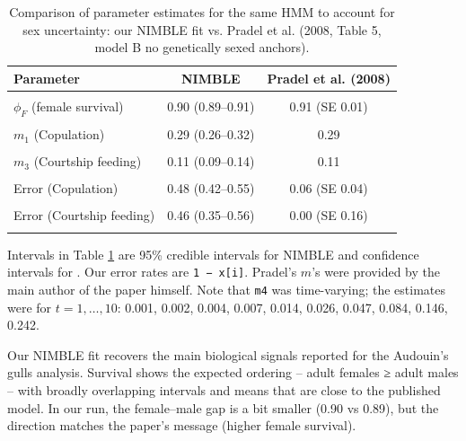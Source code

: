 \documentclass[
  12pt,
]{krantz}
\begin{document}
\begin{table}
\centering
\caption{\label{tab:sexuncertainty}Comparison of parameter estimates for the same HMM to account for sex uncertainty: our NIMBLE fit vs. Pradel et al. (2008, Table 5, model B no genetically sexed anchors).}
\centering
\begin{tabular}[t]{lcc}
\toprule
Parameter & NIMBLE & Pradel et al. (2008)\\
\midrule
\cellcolor{gray!10}{$\mu$ (proportion male)} & \cellcolor{gray!10}{0.52 (0.50–0.55)} & \cellcolor{gray!10}{0.53 (SE 0.03)}\\
$\phi_F$ (female survival) & 0.90 (0.89–0.91) & 0.91 (SE 0.01)\\
\cellcolor{gray!10}{$\phi_M$ (male survival)} & \cellcolor{gray!10}{0.89 (0.88–0.90)} & \cellcolor{gray!10}{0.86 (SE 0.01)}\\
$m_1$ (Copulation) & 0.29 (0.26–0.32) & 0.29\\
\cellcolor{gray!10}{$m_2$ (Begging)} & \cellcolor{gray!10}{0.60 (0.56–0.63)} & \cellcolor{gray!10}{0.60}\\
\addlinespace
$m_3$ (Courtship feeding) & 0.11 (0.09–0.14) & 0.11\\
\cellcolor{gray!10}{$m_4$ (Body size)} & \cellcolor{gray!10}{0.17 (0.14–0.19)} & \cellcolor{gray!10}{time-varying}\\
Error (Copulation) & 0.48 (0.42–0.55) & 0.06 (SE 0.04)\\
\cellcolor{gray!10}{Error (Begging)} & \cellcolor{gray!10}{0.45 (0.40–0.50)} & \cellcolor{gray!10}{0.06 (SE 0.03)}\\
Error (Courtship feeding) & 0.46 (0.35–0.56) & 0.00 (SE 0.16)\\
\addlinespace
\cellcolor{gray!10}{Error (Body size)} & \cellcolor{gray!10}{0.42 (0.33–0.50)} & \cellcolor{gray!10}{0.09 (SE 0.07)}\\
\bottomrule
\end{tabular}
\end{table}

\justifying

Intervals in Table \ref{tab:sexuncertainty} are 95\% credible intervals for NIMBLE and confidence intervals for \citet{pradel2008sex}. Our error rates are \texttt{1\ −\ x{[}i{]}}. Pradel's \(m\)'s were provided by the main author of the paper himself. Note that \texttt{m4} was time-varying; the estimates were for \(t=1,\ldots,10\): 0.001, 0.002, 0.004, 0.007, 0.014, 0.026, 0.047, 0.084, 0.146, 0.242.

Our NIMBLE fit recovers the main biological signals reported for the Audouin's gulls analysis. Survival shows the expected ordering -- adult females ≥ adult males -- with broadly overlapping intervals and means that are close to the published model. In our run, the female--male gap is a bit smaller (0.90 vs 0.89), but the direction matches the paper's message (higher female survival).
\end{document}
